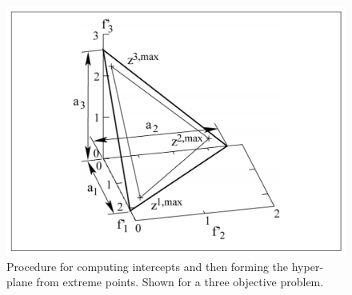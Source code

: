 \documentclass[mscthesis, 11pt]{usiinfthesis}
\theoremstyle{newdefinition}
\begin{document}
\clearpage
\begin{figure}[ht]
    \centering
    \includegraphics[scale=0.38]{literature_review/intercepts_nsga3.png}
    \caption{Procedure for computing intercepts and then forming the hyper-plane from extreme points. Shown for a three objective problem. \cite[~p.~582]{deb_evolutionary_2014}}
    \label{fig:intercepts_nsga3}
\end{figure}
\end{document}
